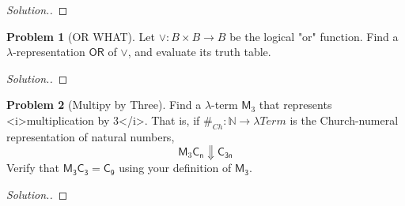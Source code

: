 \documentclass[11pt]{article}
\theoremstyle{theorem} %
\theoremstyle{definition} %
\newtheorem{problem}                    {{\color{BurntOrange}Problem}}
\theoremstyle{remark} %
\begin{document}
\begin{proof}
    [Solution.]
\end{proof}

\begin{problem}
    [OR WHAT]
    Let \(\vee \colon B \times B \to B\) be the logical "or" function. 
    Find a \(\lambda\)-representation \(\mathsf{OR}\) of \(\vee\), and evaluate its truth table.
\end{problem}

\begin{proof}
    [Solution.]
\end{proof}

\begin{problem}
    [Multipy by Three]
    Find a \(\lambda\)-term \(\mathsf{M}_3\) that represents <i>multiplication by \(3\)</i>. 
    That is, if \(\#_{Ch} \colon \mathbb N \to \lambda\mathit{Term}\) is the Church-numeral representation of natural numbers, \[
        \mathsf{M}_3\mathsf{C_n} \Downarrow \mathsf{C_{3n}}
    \]
    Verify that \(\mathsf{M_3} \mathsf{C_3} = \mathsf{C_9}\) using your definition of \(\mathsf{M_3}\).
\end{problem}

\begin{proof}
    [Solution.]
\end{proof}
\end{document}

